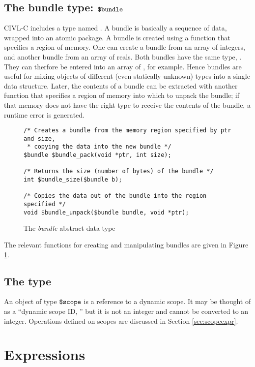 \subsection{The bundle type: $\mbox{\texttt{\${}bundle}}$}

CIVL-C includes a type named \cbundle. A bundle is basically a
sequence of data, wrapped into an atomic package. A bundle is created
using a function that specifies a region of memory. One can create a
bundle from an array of integers, and another bundle from an array of
reals. Both bundles have the same type, \cbundle. They can therfore be
entered into an array of \cbundle, for example. Hence bundles are
useful for mixing objects of different (even statically unknown) types
into a single data structure. Later, the contents of a bundle can be
extracted with another function that specifies a region of memory into
which to unpack the bundle; if that memory does not have the right
type to receive the contents of the bundle, a runtime error is
generated.

\begin{figure}
\begin{verbatim}
/* Creates a bundle from the memory region specified by ptr and size,
 * copying the data into the new bundle */
$bundle $bundle_pack(void *ptr, int size);

/* Returns the size (number of bytes) of the bundle */
int $bundle_size($bundle b);

/* Copies the data out of the bundle into the region specified */
void $bundle_unpack($bundle bundle, void *ptr);
\end{verbatim}
  \caption{The \emph{bundle} abstract data type}
  \label{fig:bundle}
\end{figure}

The relevant functions for creating and manipulating bundles
are given in Figure \ref{fig:bundle}.

\subsection{The \cscope{} type}
\label{sec:scopetype}

An object of type $\mbox{\texttt{\${}scope}}$ is a reference to a dynamic scope.  It may
be thought of as a ``dynamic scope ID, '' but it is not an integer and
cannot be converted to an integer.  Operations defined on scopes are
discussed in Section \ref{sec:scopeexpr}.

\section{Expressions}

